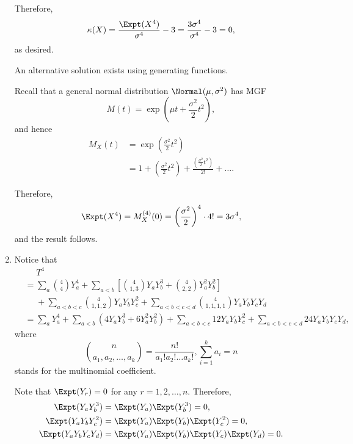 \begin{enumerate}
          Therefore,
          \[
              \kappa(X) = \frac{\Expt(X^4)}{\sigma^4} - 3 = \frac{3 \sigma^4}{\sigma^4} - 3 = 0,
          \]
          as desired.

          An alternative solution exists using generating functions.

          Recall that a general normal distribution \(\Normal(\mu, \sigma^2)\) has MGF
          \[
              M(t) = \exp(\mu t + \frac{\sigma^2}{2}t^2),
          \]
          and hence
          \begin{align*}
              M_X(t) & = \exp \left(\frac{\sigma^2}{2}t^2\right)                                                          \\
                     & = 1 + \left(\frac{\sigma^2}{2}t^2\right) + \frac{\left(\frac{\sigma^2}{2}t^2\right)}{2!} + \ldots.
          \end{align*}

          Therefore,
          \[
              \Expt(X^4) = M^{(4)}_X(0) = \left(\frac{\sigma^2}{2}\right)^4 \cdot 4! = 3 \sigma^4,
          \]
          and the result follows.

    \item Notice that
          \begin{align*}
               & \phantom{=} T^4                                                                                                                          \\
               & = \sum_{a} \binom{4}{4} Y_a^4 + \sum_{a < b} \left[\binom{4}{1, 3}Y_a Y_b^3 + \binom{4}{2, 2}Y_a^2 Y_b^2\right]                          \\
               & \phantom{=} + \sum_{a < b < c} \binom{4}{1, 1, 2}Y_a Y_b Y_c^2 + \sum_{a < b < c < d} \binom{4}{1, 1, 1, 1} Y_a Y_b Y_c Y_d              \\
               & = \sum_{a}Y_a^4 + \sum_{a < b} (4Y_a Y_b^3 + 6Y_a^2 Y_b^2) + \sum_{a < b < c} 12Y_a Y_b Y_c^2 + \sum_{a < b < c < d} 24 Y_a Y_b Y_c Y_d,
          \end{align*}
          where
          \[
              \binom{n}{a_1, a_2, \ldots, a_k} = \frac{n!}{a_1!a_2!\ldots a_k!}, \sum_{i = 1}^{k} a_i = n
          \]
          stands for the multinomial coefficient.

          Note that \(\Expt(Y_r) = 0\) for any \(r = 1, 2, \ldots, n\). Therefore,
          \begin{align*}
              \Expt(Y_a Y_b^3)       & = \Expt(Y_a) \Expt(Y_b^3) = 0,                     \\
              \Expt(Y_a Y_b Y_c^2)   & = \Expt(Y_a) \Expt(Y_b) \Expt(Y_c^2) = 0,          \\
              \Expt(Y_a Y_b Y_c Y_d) & = \Expt(Y_a) \Expt(Y_b) \Expt(Y_c) \Expt(Y_d) = 0.
          \end{align*}


\end{enumerate}
